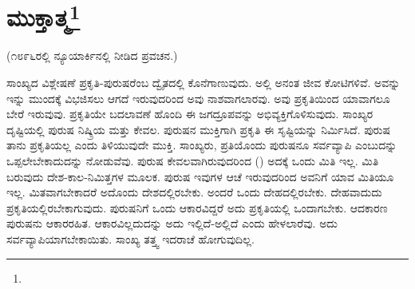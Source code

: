 
\chapter{ಮುಕ್ತಾತ್ಮ\protect\footnote{}}

\begin{center}
(೧೮೯೬ರಲ್ಲಿ ನ್ಯೂಯಾರ್ಕಿನಲ್ಲಿ ನೀಡಿದ ಪ್ರವಚನ.)
\end{center}

ಸಾಂಖ್ಯದ ವಿಶ್ಲೇಷಣೆ ಪ್ರಕೃತಿ-ಪುರುಷರೆಂಬ ದ್ವೈತದಲ್ಲಿ ಕೊನೆಗಾಣುವುದು. ಅಲ್ಲಿ ಅನಂತ ಜೀವ ಕೋಟಿಗಳಿವೆ. ಅವನ್ನು ಇನ್ನು ಮುಂದಕ್ಕೆ ವಿಭಜಿಸಲು ಆಗದೆ ಇರುವುದರಿಂದ ಅವು ನಾಶವಾಗಲಾರವು. ಅವು ಪ್ರಕೃತಿಯಿಂದ ಯಾವಾಗಲೂ ಬೇರೆ ಇರುವುವು. ಪ್ರಕೃತಿಯೇ ಬದಲಾವಣೆ ಹೊಂದಿ ಈ ಜಗದ್ರೂಪವನ್ನು ಅಭಿವ್ಯಕ್ತಿಗೊಳಿಸುವುದು. ಸಾಂಖ್ಯರ ದೃಷ್ಟಿಯಲ್ಲಿ ಪುರುಷ ನಿಷ್ಕ್ರಿಯ ಮತ್ತು ಕೇವಲ. ಪುರುಷನ ಮುಕ್ತಿಗಾಗಿ ಪ್ರಕೃತಿ ಈ ಸೃಷ್ಟಿಯನ್ನು ನಿರ್ಮಿಸಿದೆ. ಪುರುಷ ತಾನು ಪ್ರಕೃತಿಯಲ್ಲ ಎಂದು ತಿಳಿಯುವುದೇ ಮುಕ್ತಿ. ಸಾಂಖ್ಯರು, ಪ್ರತಿಯೊಂದು ಪುರುಷನೂ ಸರ್ವವ್ಯಾಪಿ ಎಂಬುದನ್ನು ಒಪ್ಪಲೇಬೇಕಾದುದನ್ನು ನೋಡುವೆವು. ಪುರುಷ ಕೇವಲವಾಗಿರುವುದರಿಂದ () ಅದಕ್ಕೆ ಒಂದು ಮಿತಿ ಇಲ್ಲ. ಮಿತಿ ಬರುವುದು ದೇಶ-ಕಾಲ-ನಿಮಿತ್ತಗಳ ಮೂಲಕ. ಪುರುಷ ಇವುಗಳ ಆಚೆ ಇರುವುದರಿಂದ ಅವನಿಗೆ ಯಾವ ಮಿತಿಯೂ ಇಲ್ಲ. ಮಿತವಾಗಬೇಕಾದರೆ ಅದೊಂದು ದೇಶದಲ್ಲಿರಬೇಕು. ಅಂದರೆ ಒಂದು ದೇಹದಲ್ಲಿರಬೇಕು. ದೇಹವಾದುದು ಪ್ರಕೃತಿಯಲ್ಲಿರಬೇಕಾಗುವುದು. ಪುರುಷನಿಗೆ ಒಂದು ಆಕಾರವಿದ್ದರೆ ಅದು ಪ್ರಕೃತಿಯಲ್ಲಿ ಒಂದಾಗಬೇಕು. ಆದಕಾರಣ ಪುರುಷನು ಆಕಾರರಹಿತ. ಆಕಾರವಿಲ್ಲದುದನ್ನು ಅದು ಇಲ್ಲಿದೆ-ಅಲ್ಲಿದೆ ಎಂದು ಹೇಳಲಾರೆವು. ಅದು ಸರ್ವವ್ಯಾಪಿಯಾಗಬೇಕಾಯಿತು. ಸಾಂಖ್ಯ ತತ್ತ್ವ ಇದರಾಚೆ ಹೋಗುವುದಿಲ್ಲ.


